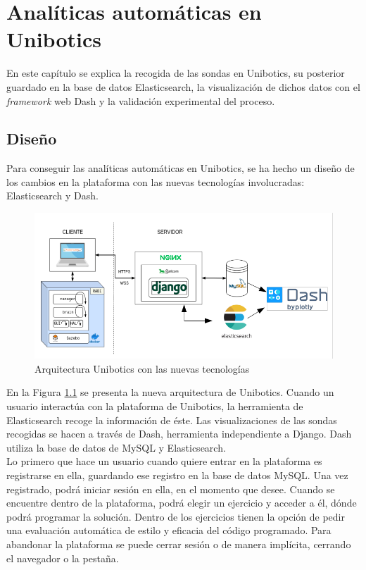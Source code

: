 \chapter{Analíticas automáticas en Unibotics}
\label{analiticas}
En este capítulo se explica la recogida de las sondas en Unibotics, su posterior guardado en la base de datos Elasticsearch, la visualización de dichos datos con el \textit{framework} web Dash y la validación experimental del proceso.

\section{Diseño}
Para conseguir las analíticas automáticas en Unibotics, se ha hecho un diseño de los cambios en la plataforma con las nuevas tecnologías involucradas: Elasticsearch y Dash.\\

\begin{figure}[H]
    \centering
    \includegraphics[width=15cm, keepaspectratio]{img/grafico.png}
    \caption{Arquitectura Unibotics con las nuevas tecnologías}
    \label{fig:grafico}
\end{figure}
En la Figura \ref{fig:grafico} se presenta la nueva arquitectura de Unibotics. Cuando un usuario interactúa con la plataforma de Unibotics, la herramienta de Elasticsearch recoge la información de éste. Las visualizaciones de las sondas recogidas se hacen a través de Dash, herramienta independiente a Django. Dash utiliza la base de datos de MySQL y Elasticsearch.\\

Lo primero que hace un usuario cuando quiere entrar en la plataforma es registrarse en ella, guardando ese registro en la base de datos MySQL. Una vez registrado, podrá iniciar sesión en ella, en el momento que desee. Cuando se encuentre dentro de la plataforma, podrá elegir un ejercicio y acceder a él, dónde podrá programar la solución. Dentro de los ejercicios tienen la opción de pedir una evaluación automática de estilo y eficacia del código programado. Para abandonar la plataforma se puede cerrar sesión o de manera implícita, cerrando el navegador o la pestaña.\\

